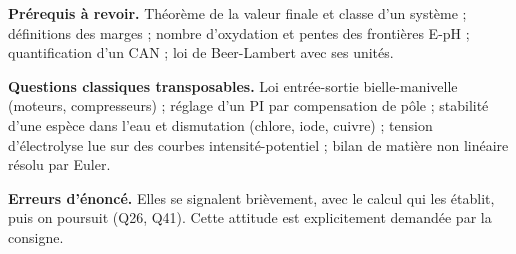 \documentclass[11pt,a4paper]{article}
\begin{document}
\textbf{Prérequis à revoir.} Théorème de la valeur finale et classe d'un système ; définitions des marges ; nombre d'oxydation et pentes des frontières E-pH ; quantification d'un CAN ; loi de Beer-Lambert avec ses unités.

\textbf{Questions classiques transposables.} Loi entrée-sortie bielle-manivelle (moteurs, compresseurs) ; réglage d'un PI par compensation de pôle ; stabilité d'une espèce dans l'eau et dismutation (chlore, iode, cuivre) ; tension d'électrolyse lue sur des courbes intensité-potentiel ; bilan de matière non linéaire résolu par Euler.

\textbf{Erreurs d'énoncé.} Elles se signalent brièvement, avec le calcul qui les établit, puis on poursuit (Q26, Q41). Cette attitude est explicitement demandée par la consigne.
\end{document}
